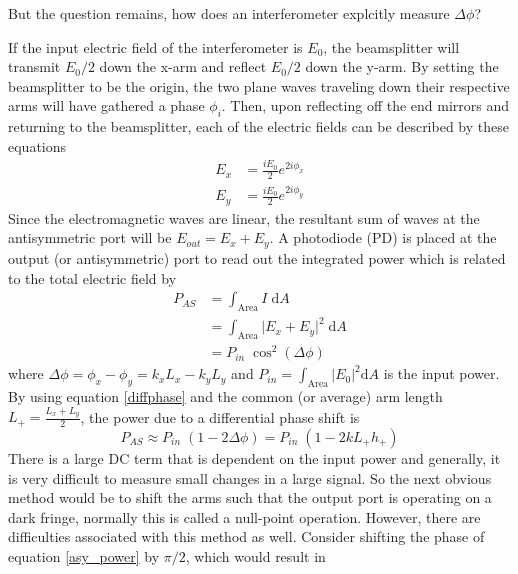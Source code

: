 		But the question remains, how does an interferometer explcitly measure $\Delta \phi$?
		
		If the input electric field of the interferometer is $E_0$, the beamsplitter will transmit $E_0 /2$ down the x-arm and reflect $E_0 /2$ down the y-arm.  By setting the beamsplitter to be the origin, the two plane waves traveling down their respective arms will have gathered a phase $\phi_i$. Then, upon reflecting off the end mirrors and returning to the beamsplitter, each of the electric fields can be described by these equations
			\begin{equation}
			\begin{aligned}
				E_{x} 	&=	\frac{i E_0}{2} e^{2i\phi_{x}}	
			\\	E_{y} 	&=	\frac{i E_0}{2} e^{2i\phi_{y}}
			\end{aligned}
			\end{equation}
		Since the electromagnetic waves are linear, the resultant sum of waves at the antisymmetric port will be $E_{out} = E_x + E_y$. A photodiode (PD) is placed at the output (or antisymmetric) port to read out the integrated power which is related to the total electric field by
			\begin{equation}
			\begin{aligned}\label{asy_power}
				P_{AS}	&= \int_{\text{Area}} I \;				\text{d}A 
			\\			&= \int_{\text{Area}} \vert E_x + E_y \vert^2 \;	\text{d}A 
			\\			&= P_{in} \; \cos^2(\Delta \phi)
			\end{aligned}
			\end{equation}	
		where $\Delta \phi = \phi_{x} - \phi_{y} = k_x L_x - k_y L_y$ and $P_{in} = \int_{\text{Area}}	 \vert E_0\vert^2 \text{d}A$ is the input power. By using equation \ref{diffphase} and the common (or average) arm length $L_{+} = \frac{L_x + L_y}{2}$, the power due to a differential phase shift is
			\begin{equation}
			P_{AS} \approx P_{in} \; (1-2 \Delta \phi) = P_{in} \; (1-2 k L_{+} h_{+})
			\end{equation}
		There is a large DC term that is dependent on the input power and generally, it is very difficult to measure small changes in a large signal. So the next obvious method would be to shift the arms such that the output port is operating on a dark fringe, normally this is called a null-point operation.  However, there are difficulties associated with this method as well.  
		Consider shifting the phase of equation \ref{asy_power} by $\pi/2$, which would result in
